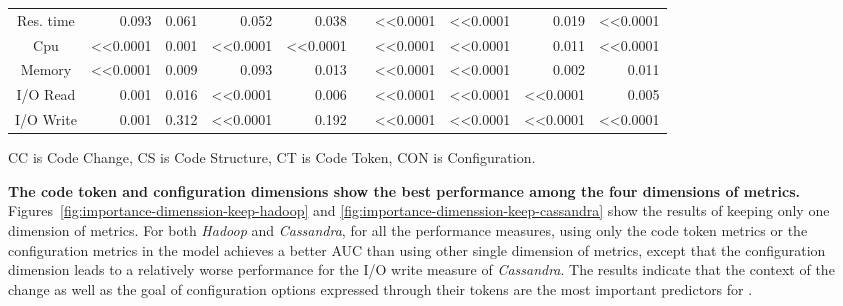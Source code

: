 \begin{table}
\begin{tabular}{|c|r|r|r|r|r|r|r|r|r|}
    Res. time & 0.093    & 0.061    & 0.052  & 0.038     &                       & \textless{}\textless{}0.0001   & \textless{}\textless{}0.0001  & 0.019& \textless{}\textless{}0.0001   \\ \cline{1-5} \cline{7-10} 
    Cpu       & \textless{}\textless{}0.0001      & 0.001    & \textless{}\textless{}0.0001    & \textless{}\textless{}0.0001       &                       & \textless{}\textless{}0.0001   & \textless{}\textless{}0.0001  & 0.011& \textless{}\textless{}0.0001   \\ \cline{1-5} \cline{7-10} 
    Memory    & \textless{}\textless{}0.0001      & 0.009    & 0.093  & 0.013     &                       & \textless{}\textless{}0.0001   & \textless{}\textless{}0.0001  & 0.002& 0.011 \\ \cline{1-5} \cline{7-10} 
    I/O Read  & 0.001    & 0.016    & \textless{}\textless{}0.0001    & 0.006     &                       & \textless{}\textless{}0.0001   & \textless{}\textless{}0.0001  & \textless{}\textless{}0.0001  & 0.005 \\ \cline{1-5} \cline{7-10} 
    I/O Write & 0.001    & 0.312    & \textless{}\textless{}0.0001    & 0.192     &                       & \textless{}\textless{}0.0001   & \textless{}\textless{}0.0001  & \textless{}\textless{}0.0001  & \textless{}\textless{}0.0001   \\ \cline{1-5} \cline{7-10} 
    \end{tabular}
\label{tab:difference}
\footnotesize{CC is Code Change, CS is Code Structure, CT is Code Token, CON is Configuration.}
\end{table}

\textbf{The code token and configuration dimensions show the best performance among the four dimensions of metrics.} Figures~\ref{fig:importance-dimenssion-keep-hadoop} and \ref{fig:importance-dimenssion-keep-cassandra} show the results of keeping only one dimension of metrics. For both \emph{Hadoop} and \emph{Cassandra}, for all the performance measures, using only the code token metrics or the configuration metrics in the model achieves a better AUC than using other single dimension of metrics, except that the configuration dimension leads to a relatively worse performance for the I/O write measure of \emph{Cassandra}.
The results indicate that the context of the change as well as the goal of configuration options expressed through their tokens are the most important predictors for \inconsistent. 

